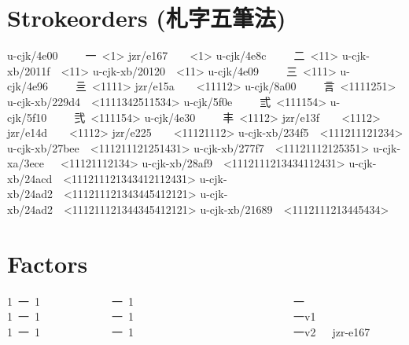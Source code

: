 \section{Strokeorders ({\cjk{}札字五筆法})
}
\begin{multicols}{2}\begingroup\mktsObeyAllLines{}

\begingroup\mktsStyleCode{}u-cjk/4e00     {\cjk{}一} <1>
jzr/e167   { }<1>
u-cjk/4e8c     {\cjk{}二} <11>
u-cjk-xb/2011f { }<11>
u-cjk-xb/20120 { }<11>
u-cjk/4e09     {\cjk{}三} <111>
u-cjk/4e96     {\cjk{}亖} <1111>
jzr/e15a   { }<11112>
u-cjk/8a00     {\cjk{}言} <1111251>
u-cjk-xb/229d4 { }<1111342511534>
u-cjk/5f0e     {\cjk{}弎} <111154>
u-cjk/5f10     {\cjk{}弐} <111154>
u-cjk/4e30     {\cjk{}丰} <1112>
jzr/e13f   { }<1112>
jzr/e14d   { }<1112>
jzr/e225   { }<11121112>
u-cjk-xb/234f5 { }<111211121234>
u-cjk-xb/27bee { }<111211121251431>
u-cjk-xb/277f7 { }<11121112125351>
u-cjk-xa/3ece  { }<11121112134>
u-cjk-xb/28af9 { }<1112111213434112431>
u-cjk-xb/24acd { }<111211121343412112431>
u-cjk-xb/24ad2 { }<111211121343445412121>
u-cjk-xb/24ad2 { }<111211121344345412121>
u-cjk-xb/21689 { }<1112111213445434>
\endgroup{}{}

\endgroup{}\end{multicols}
\section{Factors
}
\begin{multicols}{2}\end{multicols}\begingroup\mktsObeyAllLines{}

\begingroup\mktsStyleCode{}1 {\cjk{}一} 1             {\cjk{}一} 1                             {\cjk{}一} 
1 {\cjk{}一} 1             {\cjk{}一} 1                             {\cjk{}一}v1             {} 
1 {\cjk{}一} 1             {\cjk{}一} 1                             {\cjk{}一}v2   jzr-e167  {} 
 

